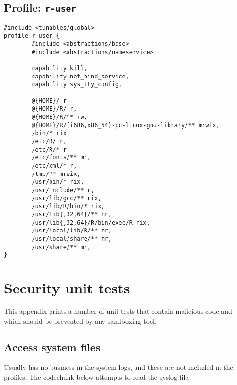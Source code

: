\section{Profile: \texttt{r-user}}
\label{r-user}

\begin{verbatim}
#include <tunables/global>
profile r-user {
        #include <abstractions/base>
        #include <abstractions/nameservice>
	
        capability kill,
        capability net_bind_service,
        capability sys_tty_config,
	
        @{HOME}/ r,
        @{HOME}/R/ r,
        @{HOME}/R/** rw,
        @{HOME}/R/{i686,x86_64}-pc-linux-gnu-library/** mrwix,
        /bin/* rix,
        /etc/R/ r,
        /etc/R/* r,
        /etc/fonts/** mr,
        /etc/xml/* r,
        /tmp/** mrwix,
        /usr/bin/* rix,
        /usr/include/** r,
        /usr/lib/gcc/** rix,		
        /usr/lib/R/bin/* rix,
        /usr/lib{,32,64}/** mr,
        /usr/lib{,32,64}/R/bin/exec/R rix,
        /usr/local/lib/R/** mr,
        /usr/local/share/** mr,
        /usr/share/** mr,
}
\end{verbatim}



\chapter{Security unit tests}

This appendix prints a number of unit tests that contain malicious code and
which should be prevented by any sandboxing tool.

\section{Access system files}

Usually \R has no business in the system logs, and these are not included in
the profiles. The codechunk below attempts to read the syslog file.

\begin{knitrout}\mycodesize
{}\color{fgcolor}\begin{kframe}
\begin{alltt}
 \hlkwb{<-} \hlstd{() \{}
    \hlstd{(}\hlstd{)}
\hlstd{\}}
\end{alltt}
\end{kframe}
\end{knitrout}


